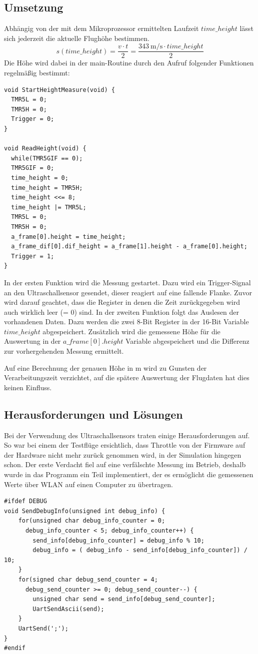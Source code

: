   \subsection{Umsetzung}
  Abhängig von der mit dem Mikroprozessor ermittelten Laufzeit $time\_height$ lässt sich jederzeit die aktuelle Flughöhe bestimmen.
  \[
  s(time\_height) = \frac{v \cdot t}{2} = \frac{\SI{343}{\meter\per\second} \cdot time\_height}{2}
  \]
  Die Höhe wird dabei in der main-Routine durch den Aufruf folgender Funktionen regelmäßig bestimmt:
  \lstset{language = c}
  \begin{lstlisting}
void StartHeightMeasure(void) {
  TMR5L = 0;
  TMR5H = 0;
  Trigger = 0;
}

void ReadHeight(void) {
  while(TMR5GIF == 0);
  TMR5GIF = 0;
  time_height = 0;
  time_height = TMR5H;
  time_height <<= 8;
  time_height |= TMR5L;
  TMR5L = 0;
  TMR5H = 0;
  a_frame[0].height = time_height;
  a_frame_dif[0].dif_height = a_frame[1].height - a_frame[0].height;
  Trigger = 1;
}
  \end{lstlisting}

  In der ersten Funktion wird die Messung gestartet. Dazu wird ein Trigger-Signal an den Ultraschallsensor gesendet, dieser reagiert auf eine fallende Flanke.
  Zuvor wird darauf geachtet, dass die Register in denen die Zeit zurückgegeben wird auch wirklich leer (= 0) sind.
  In der zweiten Funktion folgt das Auslesen der vorhandenen Daten. Dazu werden die zwei 8-Bit Register in der 16-Bit Variable $time\_height$ abgespeichert.
  Zusätzlich wird die gemessene Höhe für die Auswertung in der $a\_frame[0].height$ Variable abgespeichert und die Differenz zur vorhergehenden Messung ermittelt.

  Auf eine Berechnung der genauen Höhe in m wird zu Gunsten der Verarbeitungszeit verzichtet, auf die spätere Auswertung der Flugdaten hat dies keinen Einfluss.

  \subsection{Herausforderungen und Lösungen}
  Bei der Verwendung des Ultraschallsensors traten einige Herausforderungen auf. So war bei einem der Testflüge ersichtlich, dass Throttle von der Firmware auf der Hardware nicht mehr
  zurück genommen wird, in der Simulation hingegen schon. Der erste Verdacht fiel auf eine verfälschte Messung im Betrieb, deshalb wurde in das Programm ein Teil implementiert, der
  es ermöglicht die gemessenen Werte über WLAN auf einen Computer zu übertragen.
  \lstset{language = c}
  \begin{lstlisting}
#ifdef DEBUG
void SendDebugInfo(unsigned int debug_info) {
    for(unsigned char debug_info_counter = 0;
      debug_info_counter < 5; debug_info_counter++) {
        send_info[debug_info_counter] = debug_info % 10;
        debug_info = ( debug_info - send_info[debug_info_counter]) / 10;
    }
    for(signed char debug_send_counter = 4;
      debug_send_counter >= 0; debug_send_counter--) {
        unsigned char send = send_info[debug_send_counter];
        UartSendAscii(send);
    }
    UartSend(';');
}
#endif
  \end{lstlisting}

